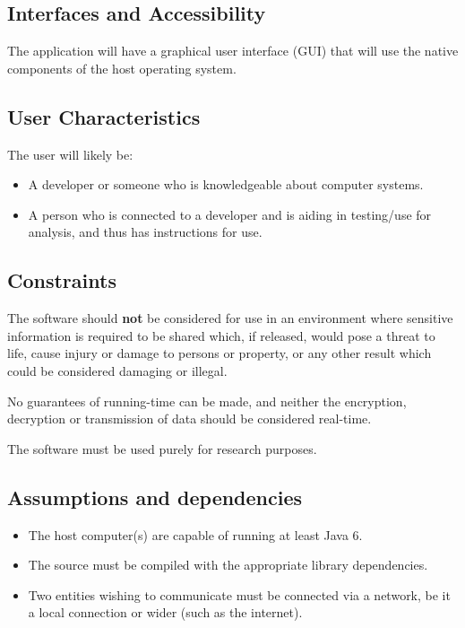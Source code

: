 \subsection{Interfaces and Accessibility}

The application will have a graphical user interface (GUI) that will use the native components of the host operating system.

\subsection{User Characteristics}

The user will likely be:

\begin{itemize}
  \item A developer or someone who is knowledgeable about computer systems.
  \item A person who is connected to a developer and is aiding in testing/use for analysis, and thus has instructions for use.	
\end{itemize}

\subsection{Constraints}

The software should \textbf{not} be considered for use in an environment where sensitive information is required to be shared which, if released, would pose a threat to life, cause injury or damage to persons or property, or any other result which could be considered damaging or illegal.

No guarantees of running-time can be made, and neither the encryption, decryption or transmission of data should be considered real-time.

The software must be used purely for research purposes.

\subsection{Assumptions and dependencies}

\begin{itemize}
  \item The host computer(s) are capable of running at least Java 6.
  \item The source must be compiled with the appropriate library dependencies.
  \item Two entities wishing to communicate must be connected via a network, be it a local connection or wider (such as the internet).
\end{itemize}